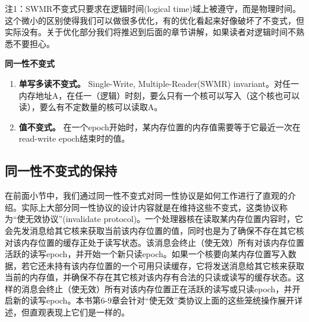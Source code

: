 \documentclass[UTF-8]{ctexrep}
\begin{document}
\par 注1：SWMR不变式只要求在逻辑时间(logical time)域上被遵守，而是物理时间。这个微小的区别使得我们可以做很多优化，有的优化看起来好像破坏了不变式，但实际没有。关于优化部分我们将推迟到后面的章节讲解，如果读者对逻辑时间不熟悉不要担心。
\begin{sidebarbox}
\centerline{\textbf{同一性不变式}}
\begin{enumerate}
\item \textbf{单写多读不变式。} Single-Write, Multiple-Reader(SWMR) invariant。对任一内存地址A，在任一（逻辑）时刻，要么只有一个核可以写入（这个核也可以读），要么有不定数量的核可以读取A。
\item \textbf{值不变式。} 在一个epoch开始时，某内存位置的内存值需要等于它最近一次在read-write epoch结束时的值。
\end{enumerate}
\end{sidebarbox}
\subsection{同一性不变式的保持}
在前面小节中，我们通过同一性不变式对同一性协议是如何工作进行了直观的介绍。实际上大部分同一性协议的设计内容就是在维持这些不变式，这类协议称为“使无效协议”(invalidate protocol)。一个处理器核在读取某内存位置内容时，它会先发消息给其它核来获取当前该内存位置的值，同时也是为了确保不存在其它核对该内存位置的缓存正处于读写状态。该消息会终止（使无效）所有对该内存位置活跃的读写epoch，并开始一个新只读epoch。如果一个核要向某内存位置写入数据，若它还未持有该内存位置的一个可用只读缓存，它将发送消息给其它核来获取当前的内存值，并确保不存在其它核对该内存有合法的只读或读写的缓存状态。这样的消息会终止（使无效）所有对该内存位置正在活跃的读写或只读epoch，并开启新的读写epoch。本书第6-9章会针对“使无效”类协议上面的这些笼统操作展开详述，但直观表现上它们是一样的。
\end{document}
